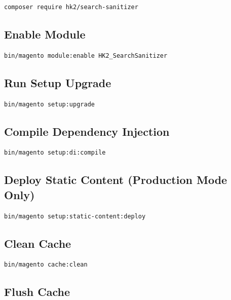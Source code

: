 \documentclass[11pt,a4paper]{article}
\begin{document}
\begin{lstlisting}[style=shell]
composer require hk2/search-sanitizer
\end{lstlisting}

\subsection{Enable Module}

\begin{lstlisting}[style=shell]
bin/magento module:enable HK2_SearchSanitizer
\end{lstlisting}

\subsection{Run Setup Upgrade}

\begin{lstlisting}[style=shell]
bin/magento setup:upgrade
\end{lstlisting}

\subsection{Compile Dependency Injection}

\begin{lstlisting}[style=shell]
bin/magento setup:di:compile
\end{lstlisting}

\subsection{Deploy Static Content (Production Mode Only)}

\begin{lstlisting}[style=shell]
bin/magento setup:static-content:deploy
\end{lstlisting}

\subsection{Clean Cache}

\begin{lstlisting}[style=shell]
bin/magento cache:clean
\end{lstlisting}

\subsection{Flush Cache}
\end{document}
